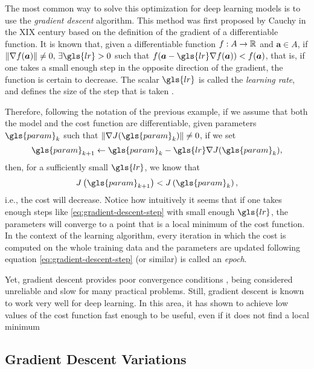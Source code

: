 The most common way to solve this optimization for deep learning models is to use the \textit{gradient descent} algorithm.
This method was first proposed by Cauchy in the XIX century \cite{lemarechal_cauchy_2012} based on the definition of the gradient of a differentiable function.
It is known that, given a differentiable function $f:A\to\mathbb{R}$ and $\bm{a} \in A$, if $\| \nabla f(\bm{a}) \| \neq 0,\,\exists \gls{lr} > 0$ such that $f(\bm{a} - \gls{lr} \nabla f(\bm{a})) < f(\bm{a})$, that is, if one takes a small enough step in the opposite direction of the gradient, the function is certain to decrease.
The scalar $\gls{lr}$ is called the \textit{learning rate}, and defines the size of the step that is taken \cite{goodfellow_deep_2016}.

Therefore, following the notation of the previous example, if we assume that both the model and the cost function are differentiable, given parameters $\gls{param}_k$ such that $\| \nabla J(\gls{param}_k) \| \neq 0$, if we set
\begin{equation}\label{eq:gradient-descent-step}
\gls{param}_{k+1} \gets \gls{param}_k - \gls{lr} \nabla J(\gls{param}_k) 
,\end{equation}
then, for a sufficiently small $\gls{lr}$, we know that \[
J\left( \gls{param}_{k+1} \right) < J\left( \gls{param}_k \right) 
,\] i.e., the cost will decrease.
Notice how intuitively it seems that if one takes enough steps like \eqref{eq:gradient-descent-step} with small enough $\gls{lr}$, the parameters will converge to a point that is a local minimum of the cost function.
In the context of the learning algorithm, every iteration in which the cost is computed on the whole training data and the parameters are updated following equation \eqref{eq:gradient-descent-step} (or similar) is called an \emph{epoch}.


Yet, gradient descent provides poor convergence conditions \cite{wolfe_convergence_1969}, being considered unreliable and slow for many practical problems.
Still, gradient descent is known to work very well for deep learning.
In this area, it has shown to achieve low values of the cost function fast enough to be useful, even if it does not find a local minimum \cite{goodfellow_deep_2016}

\subsection{Gradient Descent Variations}

